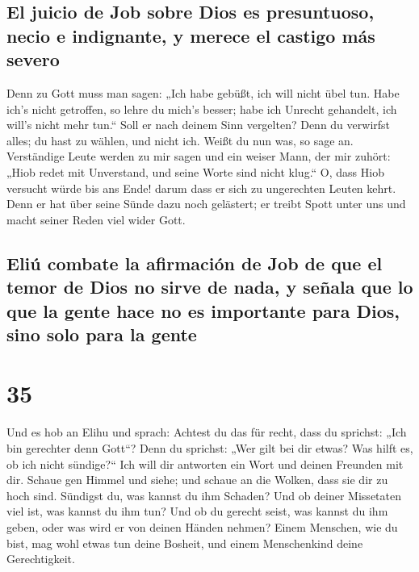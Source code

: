 \hypertarget{el-juicio-de-job-sobre-dios-es-presuntuoso-necio-e-indignante-y-merece-el-castigo-muxe1s-severo}{%
\subsection{El juicio de Job sobre Dios es presuntuoso, necio e
indignante, y merece el castigo más
severo}\label{el-juicio-de-job-sobre-dios-es-presuntuoso-necio-e-indignante-y-merece-el-castigo-muxe1s-severo}}

 Denn zu Gott muss man sagen: „Ich habe gebüßt, ich will
nicht übel tun.  Habe ich's nicht getroffen, so lehre du
mich's besser; habe ich Unrecht gehandelt, ich will's nicht mehr tun.``
 Soll er nach deinem Sinn vergelten? Denn du verwirfst
alles; du hast zu wählen, und nicht ich. Weißt du nun was, so sage an.
 Verständige Leute werden zu mir sagen und ein weiser
Mann, der mir zuhört:  „Hiob redet mit Unverstand, und
seine Worte sind nicht klug.``  O, dass Hiob versucht
würde bis ans Ende! darum dass er sich zu ungerechten Leuten kehrt.
 Denn er hat über seine Sünde dazu noch gelästert; er
treibt Spott unter uns und macht seiner Reden viel wider Gott.

\hypertarget{eliuxfa-combate-la-afirmaciuxf3n-de-job-de-que-el-temor-de-dios-no-sirve-de-nada-y-seuxf1ala-que-lo-que-la-gente-hace-no-es-importante-para-dios-sino-solo-para-la-gente}{%
\subsection{Eliú combate la afirmación de Job de que el temor de Dios no
sirve de nada, y señala que lo que la gente hace no es importante para
Dios, sino solo para la
gente}\label{eliuxfa-combate-la-afirmaciuxf3n-de-job-de-que-el-temor-de-dios-no-sirve-de-nada-y-seuxf1ala-que-lo-que-la-gente-hace-no-es-importante-para-dios-sino-solo-para-la-gente}}

\hypertarget{section-34}{%
\section{35}\label{section-34}}

 Und es hob an Elihu und sprach:  Achtest du
das für recht, dass du sprichst: „Ich bin gerechter denn Gott``?
 Denn du sprichst: „Wer gilt bei dir etwas? Was hilft es,
ob ich nicht sündige?{}``  Ich will dir antworten ein Wort
und deinen Freunden mit dir.  Schaue gen Himmel und siehe;
und schaue an die Wolken, dass sie dir zu hoch sind. 
Sündigst du, was kannst du ihm Schaden? Und ob deiner Missetaten viel
ist, was kannst du ihm tun?  Und ob du gerecht seist, was
kannst du ihm geben, oder was wird er von deinen Händen nehmen?
 Einem Menschen, wie du bist, mag wohl etwas tun deine
Bosheit, und einem Menschenkind deine Gerechtigkeit.

